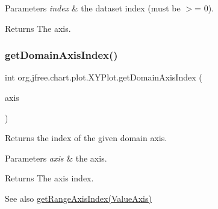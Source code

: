 \begin{DoxyParams}{Parameters}
{\em index} & the dataset index (must be $>$= 0).\\
\hline
\end{DoxyParams}
\begin{DoxyReturn}{Returns}
The axis. 
\end{DoxyReturn}
\mbox{\label{classorg_1_1jfree_1_1chart_1_1plot_1_1_x_y_plot_a9ffdbf54f2afe3ebcf1bd03410828f76}} 
\subsubsection{\texorpdfstring{get\+Domain\+Axis\+Index()}{getDomainAxisIndex()}}
{\footnotesize\ttfamily int org.\+jfree.\+chart.\+plot.\+X\+Y\+Plot.\+get\+Domain\+Axis\+Index (\begin{DoxyParamCaption}\item[{\mbox{\hyperlink{classorg_1_1jfree_1_1chart_1_1axis_1_1_value_axis}{Value\+Axis}}}]{axis }\end{DoxyParamCaption})}

Returns the index of the given domain axis.


\begin{DoxyParams}{Parameters}
{\em axis} & the axis.\\
\hline
\end{DoxyParams}
\begin{DoxyReturn}{Returns}
The axis index.
\end{DoxyReturn}
\begin{DoxySeeAlso}{See also}
\mbox{\hyperlink{classorg_1_1jfree_1_1chart_1_1plot_1_1_x_y_plot_abbc15bd6c04c452619c6243b3b8ae35c}{get\+Range\+Axis\+Index(\+Value\+Axis)}} 
\end{DoxySeeAlso}
\mbox{\label{classorg_1_1jfree_1_1chart_1_1plot_1_1_x_y_plot_a10a59b35a61cf4cd839e23f498ab674e}} 
